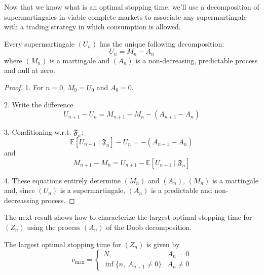 Now that we know what is an optimal stopping time, we'll use a decomposition of supermartingales in viable complete markets to associate any supermartingale with a trading strategy in which consumption is allowed.

\begin{proposition}\label{prop:doob-decomposition}
    Every supermartingale $(U_n)$ has the unique following decomposition: 
    \[
        U_n = M_n - A_n
    \]
    where $(M_n)$ is a martingale and $(A_n)$ is a non-decreasing, predictable process and null at zero.
\end{proposition}

\begin{proof}
    1. For $n = 0$, $M_0 = U_0$ and $A_0 = 0$.

    2. Write the difference
    \[
        U_{n+1} - U_n = M_{n+1} - M_n - (A_{n+1} - A_n)
    \]

    3. Conditioning w.r.t. $\mathfrak{F}_n$:
    \[
        \mathbb{E}[U_{n+1} \mid \mathfrak{F}_n] - U_n = -(A_{n+1} - A_n)
    \]
    and
    \[
        M_{n+1} - M_n = U_{n+1} - \mathbb{E}[U_{n+1} \mid \mathfrak{F}_n]
    \]

    4. These equations entirely determine $(M_n)$ and $(A_n)$, $(M_n)$ is a martingale and, since $(U_n)$ is a supermartingale, $(A_n)$ is a predictable and non-decreassing process. 
\end{proof}

The next result shows how to characterize the largest optimal stopping time for $(Z_n)$ using the process $(A_n)$ of the Doob decomposition.

\begin{proposition}\label{prop:2.3.2}
    The largest optimal stopping time for $(Z_n)$ is given by 
    \begin{equation*}
        \nu_{\max} =
        \begin{cases}
            N, & A_n = 0 \\
            \inf\{n, ~A_{n+1} \neq 0\} & A_n \neq 0
        \end{cases}
    \end{equation*}
\end{proposition}

